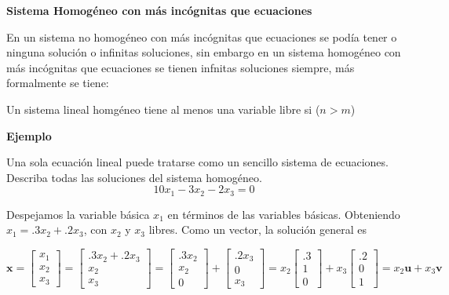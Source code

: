 \documentclass{article}
\begin{document}
\begin{large}
    \textbf{Sistema Homogéneo con más incógnitas que ecuaciones}
\end{large}

En un sistema no homogéneo con más incógnitas que ecuaciones se podía tener o ninguna solución o infinitas soluciones, sin embargo en un sistema homogéneo con más incógnitas que ecuaciones se tienen infnitas soluciones siempre, más formalmente se tiene:

\begin{tcolorbox}[colback=green!20!white,colframe=green!80!black,title=Ecuaciones con más Incógnitas que Ecuaciones]
    Un sistema lineal homgéneo tiene al menos una variable libre si ($n > m$)
\end{tcolorbox}
 
\pagebreak

\begin{large}
    \textbf{Ejemplo}
\end{large}

Una sola ecuación lineal puede tratarse como un sencillo sistema de ecuaciones. Describa todas las soluciones del sistema homogéneo.$$10x_1 - 3x_2 - 2x_3 = 0$$

Despejamos la variable básica $x_1$ en términos de las variables básicas. Obteniendo $x_1 = .3x_2 + .2x_3$, con $x_2$ y $x_3$ libres. Como un vector, la solución general es

\begin{equation*}
    \mathbf{x} = \left[\begin{array}{c}
        x_1\\
        x_2\\
        x_3
    \end{array}\right]
    = \left[\begin{array}{c}
        .3x_2 + .2x_3\\
        x_2\\
        x_3
    \end{array}\right]
    = \left[\begin{array}{c}
        .3x_2\\
        x_2\\
        0
    \end{array}\right]
    + \left[\begin{array}{c}
        .2x_3\\
        0\\
        x_3
    \end{array}\right]
    = x_2 \left[\begin{array}{c}
        .3\\
        1\\
        0
    \end{array}\right] 
    +  x_3 \left[\begin{array}{c}
        .2\\
        0\\
        1
    \end{array}\right]
    = x_2\mathbf{u} + x_3\mathbf{v}
\end{equation*}
\end{document}
